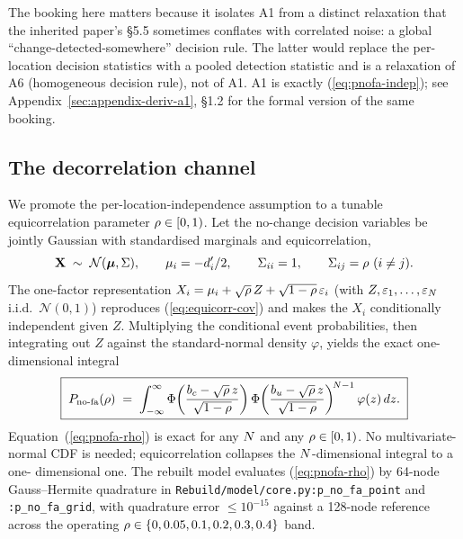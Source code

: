 \begin{remark}
The booking here matters because it isolates A1 from a distinct
relaxation that the inherited paper's §5.5 sometimes conflates with
correlated noise: a global ``change-detected-somewhere'' decision
rule. The latter would replace the per-location decision statistics
with a pooled detection statistic and is a relaxation of A6
(homogeneous decision rule), not of A1. A1 is exactly
(\ref{eq:pnofa-indep}); see
Appendix~\ref{sec:appendix-deriv-a1}, §1.2 for the formal version
of the same booking.
\end{remark}

\subsection{The decorrelation channel}
\label{sec:model-rho-channel}

We promote the per-location-independence assumption to a tunable
equicorrelation parameter $\rho \in [0, 1)$. Let the no-change
decision variables be jointly Gaussian with standardised marginals
and equicorrelation,
\begin{equation}
  \mathbf{X} \;\sim\; \mathcal{N}(\boldsymbol\mu, \Sigma),
  \qquad
  \mu_i = -d'_i/2,
  \qquad
  \Sigma_{ii} = 1,
  \qquad
  \Sigma_{ij} = \rho \ (i \neq j).
  \label{eq:equicorr-cov}
\end{equation}
The one-factor representation
$X_i = \mu_i + \sqrt{\rho}\,Z + \sqrt{1 - \rho}\,\varepsilon_i$
(with $Z, \varepsilon_1, \dots, \varepsilon_N$ i.i.d.\
$\mathcal{N}(0, 1)$) reproduces (\ref{eq:equicorr-cov}) and makes the
$X_i$ conditionally independent given $Z$. Multiplying the
conditional event probabilities, then integrating out $Z$ against the
standard-normal density $\varphi$, yields the exact one-dimensional
integral
\begin{equation}
  \boxed{\;
    P_{\mathrm{no\text{-}fa}}(\rho)
    \;=\;
    \int_{-\infty}^{\infty}
    \Phi\!\left(\frac{b_c - \sqrt{\rho}\,z}{\sqrt{1 - \rho}}\right)
    \Phi\!\left(\frac{b_u - \sqrt{\rho}\,z}{\sqrt{1 - \rho}}\right)^{\!N - 1}
    \varphi(z)\,dz.
  \;}
  \label{eq:pnofa-rho}
\end{equation}
Equation~(\ref{eq:pnofa-rho}) is exact for any $N$ and any
$\rho \in [0, 1)$. No multivariate-normal CDF is needed;
equicorrelation collapses the $N$-dimensional integral to a one-
dimensional one. The rebuilt model evaluates
(\ref{eq:pnofa-rho}) by 64-node Gauss--Hermite quadrature in
\texttt{Rebuild/model/core.py:p\_no\_fa\_point} and
\texttt{:p\_no\_fa\_grid}, with quadrature error $\le 10^{-15}$
against a 128-node reference across the operating
$\rho \in \{0, 0.05, 0.1, 0.2, 0.3, 0.4\}$ band.


